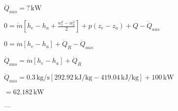 \( \dot{Q}_{aus} = ? \, \text{kW} \)  

\( 0 = \dot{m} \left[ h_e - h_a + \frac{w_e^2 - w_a^2}{2} \right] + p \left( z_e - z_a \right) + Q - \dot{Q}_{aus} \)  

\( 0 = \dot{m} \left[ h_e - h_a \right] + \dot{Q}_R - \dot{Q}_{aus} \)  

\( \dot{Q}_{aus} = \dot{m} \left[ h_e - h_a \right] + \dot{Q}_R \)  

\( \dot{Q}_{aus} = 0.3 \, \text{kg/s} \left[ 292.92 \, \text{kJ/kg} - 419.04 \, \text{kJ/kg} \right] + 100 \, \text{kW} \)  

\( = 62.182 \, \text{kW} \)  

---